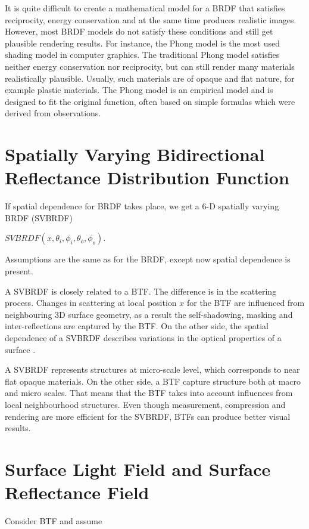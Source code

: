 It is quite difficult to create a mathematical model for a BRDF that satisfies reciprocity,
energy conservation and at the same time produces realistic images.
 However, most BRDF models do not satisfy these conditions and still get plausible rendering results.
For instance, the Phong model \cite{Phong} is the most used shading model in computer graphics. 
The traditional Phong model satisfies neither energy conservation nor reciprocity, but can still render many materials realistically plausible.
Usually, such materials are of opaque and flat nature, for example plastic materials.
The Phong model is an empirical model and is designed to fit the original function, often based on simple formulas which were derived from observations.


\section{Spatially Varying Bidirectional Reflectance Distribution Function}
\label{section:svbrdf}
If spatial dependence for BRDF takes place, we get a 6-D spatially varying BRDF (SVBRDF)


 \begin{center}
$SVBRDF(x,\theta_{i} ,\phi_{i},\theta_{o} ,\phi_{o})$.
 \end{center}
 Assumptions are the same as for the BRDF, except now spatial dependence is present.
 
A SVBRDF is closely related to a BTF. The difference is in the scattering process. 
Changes in scattering at local position $x$ for the BTF are influenced from neighbouring 3D surface geometry, as a result the self-shadowing, masking and inter-reflections are captured by the BTF.
On the other side, the spatial dependence of a SVBRDF describes variations in the optical properties of a surface \cite{haindl_visual}.


 
A SVBRDF represents structures at micro-scale level, which corresponds to near flat opaque materials. On the other side, a BTF capture structure both at macro and micro scales.
 That means that the BTF takes into account influences from local neighbourhood structures. Even though measurement, compression and rendering are more efficient for the SVBRDF, 
  BTFs can produce better visual results. \cite{haindl_visual}
 
 
\section{Surface Light Field and Surface Reflectance Field}
\label{section:slf}
Consider BTF and assume

